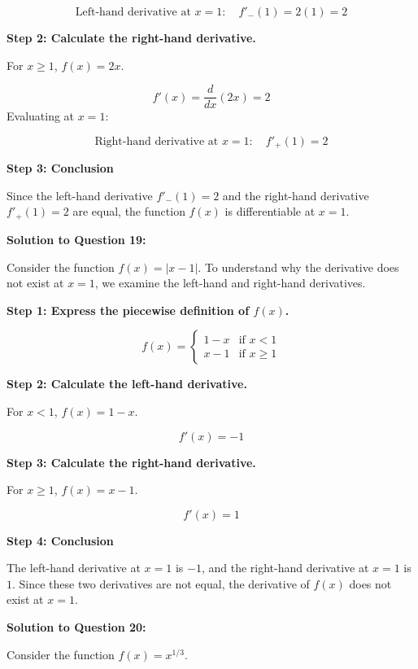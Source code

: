 \documentclass{article}
\begin{document}
    \[
    \text{Left-hand derivative at } x = 1: \quad f'_-(1) = 2(1) = 2
    \]

    \textbf{Step 2: Calculate the right-hand derivative.}

    For \( x \geq 1 \), \( f(x) = 2x \).

    \[
    f'(x) = \frac{d}{dx} (2x) = 2
    \]
    Evaluating at \( x = 1 \):

    \[
    \text{Right-hand derivative at } x = 1: \quad f'_+(1) = 2
    \]

    \textbf{Step 3: Conclusion}

    Since the left-hand derivative \( f'_-(1) = 2 \) and the right-hand derivative \( f'_+(1) = 2 \) are equal, the function \( f(x) \) is differentiable at \( x = 1 \).

    \item \textbf{Solution to Question 19:}

    Consider the function \( f(x) = |x - 1| \). To understand why the derivative does not exist at \( x = 1 \), we examine the left-hand and right-hand derivatives.

    \textbf{Step 1: Express the piecewise definition of \( f(x) \).}

    \[
    f(x) = 
    \begin{cases} 
    1 - x & \text{if } x < 1 \\
    x - 1 & \text{if } x \geq 1 
    \end{cases}
    \]

    \textbf{Step 2: Calculate the left-hand derivative.}

    For \( x < 1 \), \( f(x) = 1 - x \).

    \[
    f'(x) = -1
    \]

    \textbf{Step 3: Calculate the right-hand derivative.}

    For \( x \geq 1 \), \( f(x) = x - 1 \).

    \[
    f'(x) = 1
    \]

    \textbf{Step 4: Conclusion}

    The left-hand derivative at \( x = 1 \) is \( -1 \), and the right-hand derivative at \( x = 1 \) is \( 1 \). Since these two derivatives are not equal, the derivative of \( f(x) \) does not exist at \( x = 1 \).

    \item \textbf{Solution to Question 20:}

    Consider the function \( f(x) = x^{1/3} \).
\end{document}
